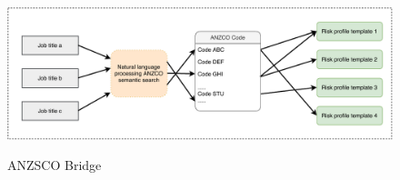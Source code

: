 \begin{figure}[!htb]
    \caption{ANZSCO Bridge}
    \includegraphics[width=1.0\columnwidth]{fig/ANZCO_RiskProfile.pdf}
    \label{fig:anzcoriskprofile}
\end{figure}
